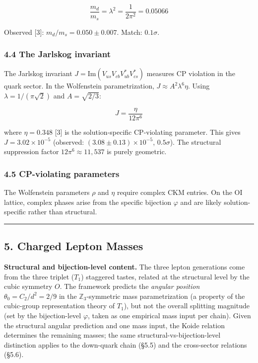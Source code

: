 \documentclass[
  11pt,
]{article}
\begin{document}
\[\boxed{\frac{m_d}{m_s} = \lambda^2 = \frac{1}{2\pi^2} = 0.05066}\]

Observed {[}3{]}: \(m_d/m_s = 0.050 \pm 0.007\). Match: \(0.1\sigma\).

\hypertarget{the-jarlskog-invariant}{%
\subsubsection{4.4 The Jarlskog
invariant}\label{the-jarlskog-invariant}}

The Jarlskog invariant \(J = \text{Im}(V_{us}V_{cb}V^*_{ub}V^*_{cs})\)
measures CP violation in the quark sector. In the Wolfenstein
parametrization, \(J \approx A^2\lambda^6\eta\). Using
\(\lambda = 1/(\pi\sqrt{2})\) and \(A = \sqrt{2/3}\):

\[J = \frac{\eta}{12\pi^6}\]

where \(\eta = 0.348\) {[}3{]} is the solution-specific CP-violating
parameter. This gives \(J = 3.02 \times 10^{-5}\) (observed:
\((3.08 \pm 0.13) \times 10^{-5}\), \(0.5\sigma\)). The structural
suppression factor \(12\pi^6 \approx 11{,}537\) is purely geometric.

\hypertarget{cp-violating-parameters}{%
\subsubsection{4.5 CP-violating
parameters}\label{cp-violating-parameters}}

The Wolfenstein parameters \(\rho\) and \(\eta\) require complex CKM
entries. On the OI lattice, complex phases arise from the specific
bijection \(\varphi\) and are likely solution-specific rather than
structural.

\begin{center}\rule{0.5\linewidth}{0.5pt}\end{center}

\hypertarget{charged-lepton-masses}{%
\subsection{5. Charged Lepton Masses}\label{charged-lepton-masses}}

\textbf{Structural and bijection-level content.} The three lepton
generations come from the three triplet (\(T_1\)) staggered tastes,
related at the structural level by the cubic symmetry \(O\). The
framework predicts the \emph{angular position}
\(\theta_0 = C_2/d^2 = 2/9\) in the \(\mathbb{Z}_3\)-symmetric mass
parametrization (a property of the cubic-group representation theory of
\(T_1\)), but not the overall splitting magnitude (set by the
bijection-level \(\varphi\), taken as one empirical mass input per
chain). Given the structural angular prediction and one mass input, the
Koide relation determines the remaining masses; the same
structural-vs-bijection-level distinction applies to the down-quark
chain (§5.5) and the cross-sector relations (§5.6).
\end{document}
